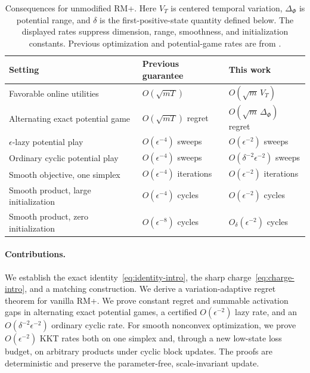\documentclass{article}
\begin{document}
\begin{table}[t]
\centering
\small
\begin{tabular}{@{}lll@{}}
\toprule
Setting & Previous guarantee & This work \\
\midrule
Favorable online utilities & $O(\sqrt{mT})$ & $O(\sqrt m\,V_T)$ \\
Alternating exact potential game & $O(\sqrt{mT})$ regret & $O(\sqrt m\,\Delta_\Phi)$ regret \\
$\epsilon$-lazy potential play & $O(\epsilon^{-4})$ sweeps & $O(\epsilon^{-2})$ sweeps \\
Ordinary cyclic potential play & $O(\epsilon^{-4})$ sweeps & $O(\delta^{-2}\epsilon^{-2})$ sweeps \\
Smooth objective, one simplex & $O(\epsilon^{-4})$ iterations & $O(\epsilon^{-2})$ iterations \\
Smooth product, large initialization & $O(\epsilon^{-4})$ cycles & $O(\epsilon^{-2})$ cycles \\
Smooth product, zero initialization & $O(\epsilon^{-8})$ cycles & $O_\delta(\epsilon^{-2})$ cycles \\
\bottomrule
\end{tabular}
\caption{Consequences for unmodified RM+. Here $V_T$ is centered temporal variation, $\Delta_\Phi$ is potential range, and $\delta$ is the first-positive-state quantity defined below. The displayed rates suppress dimension, range, smoothness, and initialization constants. Previous optimization and potential-game rates are from \citet{Anagnostides26:Convergence}.}
\label{tab:summary}
\end{table}

\paragraph{Contributions.} We establish the exact identity~\eqref{eq:identity-intro}, the sharp charge~\eqref{eq:charge-intro}, and a matching construction. We derive a variation-adaptive regret theorem for vanilla RM+. We prove constant regret and summable activation gaps in alternating exact potential games, a certified $O(\epsilon^{-2})$ lazy rate, and an $O(\delta^{-2}\epsilon^{-2})$ ordinary cyclic rate. For smooth nonconvex optimization, we prove $O(\epsilon^{-2})$ KKT rates both on one simplex and, through a new low-state loss budget, on arbitrary products under cyclic block updates. The proofs are deterministic and preserve the parameter-free, scale-invariant update.
\end{document}
